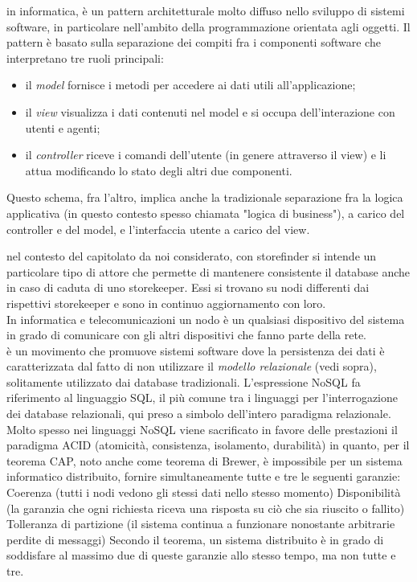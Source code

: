 \documentclass{scalatekids-article}
\begin{document}
   in informatica, è un pattern architetturale molto diffuso nello sviluppo di sistemi software, in particolare nell'ambito della programmazione orientata agli oggetti.
  Il pattern è basato sulla separazione dei compiti fra i componenti software che interpretano tre ruoli principali:
  \begin{itemize}
  \item il \textit{model} fornisce i metodi per accedere ai dati utili all'applicazione;
	\item il \textit{view} visualizza i dati contenuti nel model e si occupa dell'interazione con utenti e agenti;
	\item il \textit{controller} riceve i comandi dell'utente (in genere attraverso il view) e li attua modificando lo stato degli altri due componenti.
  \end{itemize}
  Questo schema, fra l'altro, implica anche la tradizionale separazione fra la logica applicativa (in questo contesto spesso chiamata "logica di business"), a carico del controller e del model, e l'interfaccia utente a carico del view.
  \\


   nel contesto del capitolato da noi considerato, con storefinder si intende un particolare tipo di attore che permette di mantenere consistente il database anche in caso di caduta di uno storekeeper. Essi si trovano su nodi differenti dai rispettivi storekeeper e sono in continuo aggiornamento con loro.
  \\

   In informatica e telecomunicazioni un nodo è un qualsiasi dispositivo del sistema in grado di comunicare con gli altri dispositivi che fanno parte della rete.
  \\

   è un movimento che promuove sistemi software dove la persistenza dei dati è caratterizzata dal fatto di non utilizzare il \textit{modello relazionale} (vedi sopra), solitamente utilizzato dai database tradizionali.
  L'espressione NoSQL fa riferimento al linguaggio SQL, il più comune tra i linguaggi per l'interrogazione dei database relazionali, qui preso a simbolo dell'intero paradigma relazionale. Molto spesso nei linguaggi NoSQL viene sacrificato in favore delle prestazioni il paradigma ACID (atomicità, consistenza, isolamento, durabilità) in quanto, per il teorema CAP, noto anche come teorema di Brewer, è impossibile per un sistema informatico distribuito, fornire simultaneamente tutte e tre le seguenti garanzie:
  Coerenza (tutti i nodi vedono gli stessi dati nello stesso momento)
  Disponibilità (la garanzia che ogni richiesta riceva una risposta su ciò che sia riuscito o fallito)
  Tolleranza di partizione (il sistema continua a funzionare nonostante arbitrarie perdite di messaggi)
  Secondo il teorema, un sistema distribuito è in grado di soddisfare al massimo due di queste garanzie allo stesso tempo, ma non tutte e tre.
  \\
\end{document}
